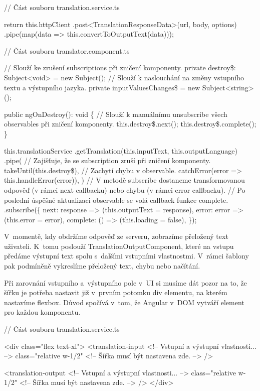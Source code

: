 \begin{prog}
// Část souboru translation.service.ts

return this.httpClient
  .post<TranslationResponseData>(url, body, options)
  .pipe(map(data => this.convertToOutputText(data)));

// Část souboru translator.component.ts

// Slouží ke zrušení subscriptions při zničení komponenty.
private destroy\$: Subject<void> = new Subject();
// Slouží k naslouchání na změny vstupního textu a výstupního jazyka.
private inputValuesChanges\$ = new Subject<string>();

public ngOnDestroy(): void \{
  // Slouží k manuálnímu unsubscribe všech observables při zničení komponenty.
  this.destroy\$.next();
  this.destroy\$.complete();
\}

this.translationService
  .getTranslation(this.inputText, this.outputLanguage)
  .pipe(
    // Zajišťuje, že se subscription zruší při zničení komponenty.
    takeUntil(this.destroy\$),
    // Zachytí chybu v observable.
    catchError(error => this.handleError(error)),
  )
  // V metodě subscribe dostaneme transformovanou odpověď 
    (v rámci next callbacku) nebo chybu (v rámci error callbacku).
  // Po poslední úspěšné aktualizaci observable se volá callback funkce complete.
  .subscribe(\{
    next: response => (this.outputText = response),
    error: error => (this.error = error),
    complete: () => (this.loading = false),
  \});
\end{prog}

V~momentě, kdy obdržíme odpověď ze serveru, zobrazíme přeložený text uživateli. 
K~tomu poslouží TranslationOutputComponent, které na vstupu předáme výstupní text spolu s~dalšími vstupními vlastnostmi. 
V~rámci šablony pak podmíněně vykreslíme přeložený text, chybu nebo načítání. 

Při zarovnání vstupního a~výstupního pole v~UI si musíme dát pozor na to, že šířku je potřeba nastavit již v~prvním potomku div elementu, na kterém nastavíme flexbox. 
Důvod spočívá v~tom, že Angular v~DOM vytváří element pro každou komponentu.

\begin{prog}
// Část souboru translation.service.ts

<div class="flex text-xl">
  <translation-input 
    <!-- Vstupní a výstupní vlastnosti... -->
    class="relative w-1/2"
    <!-- Šířka musí být nastavena zde. -->
  />

  <translation-output 
    <!-- Vstupní a výstupní vlastnosti... -->
    class="relative w-1/2"
    <!-- Šířka musí být nastavena zde. -->
  />
</div>
\end{prog}

